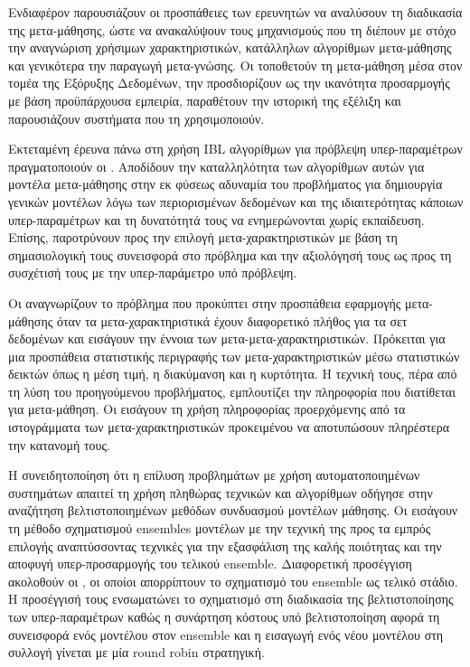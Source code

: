 Ενδιαφέρον παρουσιάζουν οι προσπάθειες των ερευνητών να αναλύσουν τη διαδικασία της μετα-μάθησης, ώστε να ανακαλύψουν τους μηχανισμούς που τη διέπουν με στόχο την αναγνώριση χρήσιμων χαρακτηριστικών, κατάλληλων αλγορίθμων μετα-μάθησης και γενικότερα την παραγωγή μετα-γνώσης. Οι \citet{Brazdil2009} τοποθετούν τη μετα-μάθηση μέσα στον τομέα της Εξόρυξης Δεδομένων, την προσδιορίζουν ως την ικανότητα προσαρμογής με βάση προϋπάρχουσα εμπειρία, παραθέτουν την ιστορική της εξέλιξη και παρουσιάζουν συστήματα που τη χρησιμοποιούν.

Εκτεταμένη έρευνα πάνω στη χρήση \gls{IBL} αλγορίθμων για πρόβλεψη υπερ-παραμέτρων πραγματοποιούν οι \citet{Abdulrahman:2014:MCA:3015544.3015557}. Αποδίδουν την καταλληλότητα των αλγορίθμων αυτών για μοντέλα μετα-μάθησης στην εκ φύσεως αδυναμία του προβλήματος για δημιουργία γενικών μοντέλων λόγω των περιορισμένων δεδομένων και της ιδιαιτερότητας κάποιων υπερ-παραμέτρων και τη δυνατότητά τους να ενημερώνονται χωρίς εκπαίδευση. Επίσης, παροτρύνουν προς την επιλογή μετα-χαρακτηριστικών με βάση τη σημασιολογική τους συνεισφορά στο πρόβλημα και την αξιολόγησή τους ως προς τη συσχέτισή τους με την υπερ-παράμετρο υπό πρόβλεψη. 

Οι \citet{Reif_meta2-features:} αναγνωρίζουν το πρόβλημα που προκύπτει στην προσπάθεια εφαρμογής μετα-μάθησης όταν τα μετα-χαρακτηριστικά έχουν διαφορετικό πλήθος για τα σετ δεδομένων και εισάγουν την έννοια των μετα-μετα-χαρακτηριστικών. Πρόκειται για μια προσπάθεια στατιστικής περιγραφής των μετα-χαρακτηριστικών μέσω στατιστικών δεικτών όπως η μέση τιμή, η διακύμανση και η κυρτότητα. Η τεχνική τους, πέρα από τη λύση του προηγούμενου προβλήματος, εμπλουτίζει την πληροφορία που διατίθεται για μετα-μάθηση. Οι \citet{Bensusan:2001:EPA:645328.650030} εισάγουν τη χρήση πληροφορίας προερχόμενης από τα ιστογράμματα των μετα-χαρακτηριστικών προκειμένου να αποτυπώσουν πληρέστερα την κατανομή τους.

Η συνειδητοποίηση ότι η επίλυση προβλημάτων με χρήση αυτοματοποιημένων συστημάτων απαιτεί τη χρήση πληθώρας τεχνικών και αλγορίθμων οδήγησε στην αναζήτηση βελτιστοποιημένων μεθόδων συνδυασμού μοντέλων μάθησης. Οι \citet{Caruana:2004:ESL:1015330.1015432} εισάγουν τη μέθοδο σχηματισμού ensembles μοντέλων με την τεχνική της προς τα εμπρός επιλογής αναπτύσσοντας τεχνικές για την εξασφάλιση της καλής ποιότητας και την αποφυγή υπερ-προσαρμογής του τελικού ensemble. Διαφορετική προσέγγιση ακολοθούν οι \citet{ensemble}, οι οποίοι απορρίπτουν το σχηματισμό του ensemble ως τελικό στάδιο. Η προσέγγισή τους ενσωματώνει το σχηματισμό στη διαδικασία της βελτιστοποίησης των υπερ-παραμέτρων καθώς η συνάρτηση κόστους υπό βελτιστοποίηση αφορά τη συνεισφορά ενός μοντέλου στον ensemble και η εισαγωγή ενός νέου μοντέλου στη συλλογή γίνεται με μία round robin στρατηγική. 